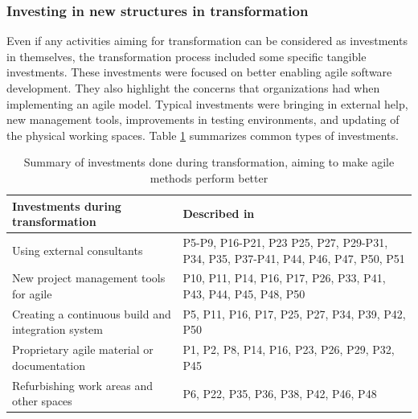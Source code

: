 \documentclass[preprint,authoryear,12pt]{elsarticle}
\begin{document}


\subsubsection{Investing in new structures in transformation}

Even if any activities aiming for transformation can be considered as
investments in themselves, the transformation process included some specific
tangible investments. These investments were focused on better enabling agile
software development. They also highlight the concerns that organizations had when
implementing an agile model. Typical investments were bringing in external help,
new management tools, improvements in testing environments, and updating of the
physical working spaces. Table \ref{table:transformation_investments} summarizes
common types of investments.


\begin{table}[h]
    \centering
    \begin{tabular}{ >{\raggedright\arraybackslash}p{}
                     >{\raggedright\arraybackslash}p{} }
        \toprule
        Investments during transformation      &  Described in  \\
        \midrule
        Using external consultants  &
                P5-P9, P16-P21, P23 P25, P27, P29-P31,
                P34, P35, P37-P41, P44, P46, P47, P50, P51  \\  %
        New project management tools for agile  &
                P10, P11, P14, P16, P17, P26, P33,
                P41, P43, P44, P45, P48, P50 \\
        Creating a continuous build and integration system  &
                P5, P11, P16, P17, P25, P27, P34, P39, P42, P50 \\
        Proprietary agile material or documentation   & 
                P1, P2, P8, P14, P16, P23, P26, P29, P32, P45  \\
        Refurbishing work areas and other spaces   &
                P6, P22, P35, P36, P38, P42, P46, P48 \\
        \bottomrule
    \end{tabular}
    \caption{Summary of investments done during transformation, aiming to make
             agile methods perform better}
    \label{table:transformation_investments}
\end{table}
\end{document}
